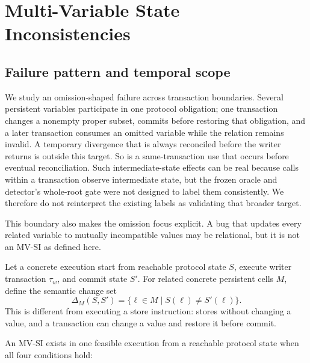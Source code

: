 \section{Multi-Variable State Inconsistencies}
\label{s:mvsi}

\subsection{Failure pattern and temporal scope}
\label{s:mvsi-definition}

We study an omission-shaped failure across transaction boundaries. Several persistent variables participate in one protocol obligation; one transaction changes a nonempty proper subset, commits before restoring that obligation, and a later transaction consumes an omitted variable while the relation remains invalid. A temporary divergence that is always reconciled before the writer returns is outside this target. So is a same-transaction use that occurs before eventual reconciliation. Such intermediate-state effects can be real because calls within a transaction observe intermediate state, but the frozen oracle and detector's whole-root gate were not designed to label them consistently. We therefore do not reinterpret the existing labels as validating that broader target.

This boundary also makes the omission focus explicit. A bug that updates every related variable to mutually incompatible values may be relational, but it is not an MV-SI as defined here.

Let a concrete execution start from reachable protocol state \(S\), execute writer transaction \(\tau_w\), and commit state \(S'\). For related concrete persistent cells \(M\), define the semantic change set
\[
  \Delta_M(S,S') = \{\ell\in M \mid S(\ell)\ne S'(\ell)\}.
\]
This is different from executing a store instruction:  stores without changing a value, and a transaction can change a value and restore it before commit.

An MV-SI exists in one feasible execution from a reachable protocol state when all four conditions hold:

